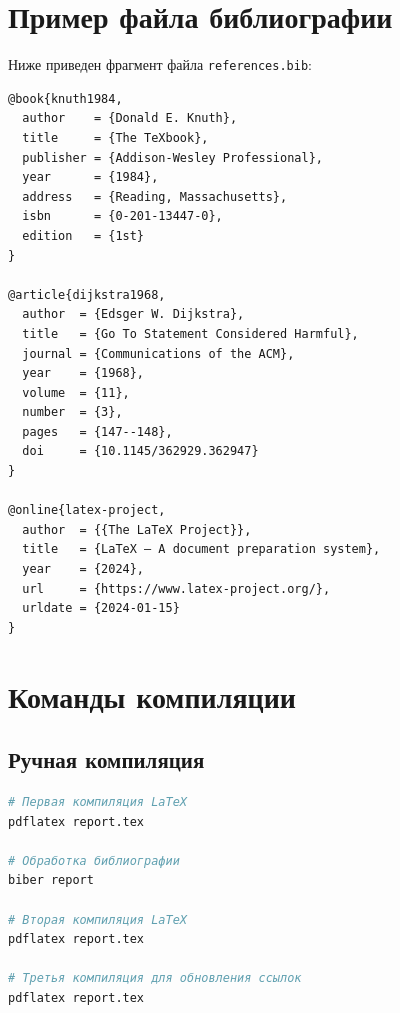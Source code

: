 \documentclass[12pt, a4paper]{article}
\begin{document}

\newpage
\appendix

\section{Пример файла библиографии}

Ниже приведен фрагмент файла \texttt{references.bib}:

\begin{lstlisting}[language=TeX, caption={Фрагмент references.bib}]
@book{knuth1984,
  author    = {Donald E. Knuth},
  title     = {The TeXbook},
  publisher = {Addison-Wesley Professional},
  year      = {1984},
  address   = {Reading, Massachusetts},
  isbn      = {0-201-13447-0},
  edition   = {1st}
}

@article{dijkstra1968,
  author  = {Edsger W. Dijkstra},
  title   = {Go To Statement Considered Harmful},
  journal = {Communications of the ACM},
  year    = {1968},
  volume  = {11},
  number  = {3},
  pages   = {147--148},
  doi     = {10.1145/362929.362947}
}

@online{latex-project,
  author  = {{The LaTeX Project}},
  title   = {LaTeX – A document preparation system},
  year    = {2024},
  url     = {https://www.latex-project.org/},
  urldate = {2024-01-15}
}
\end{lstlisting}

\section{Команды компиляции}

\subsection{Ручная компиляция}

\begin{lstlisting}[language=bash, caption={Последовательность команд компиляции}]
# Первая компиляция LaTeX
pdflatex report.tex

# Обработка библиографии
biber report

# Вторая компиляция LaTeX
pdflatex report.tex

# Третья компиляция для обновления ссылок
pdflatex report.tex
\end{lstlisting}
\end{document}
